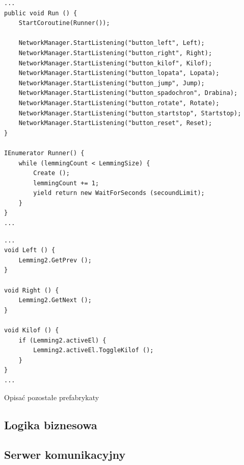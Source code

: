 \begin{lstlisting}[language=CSharp]
...
public void Run () {
	StartCoroutine(Runner());

	NetworkManager.StartListening("button_left", Left);
	NetworkManager.StartListening("button_right", Right);
	NetworkManager.StartListening("button_kilof", Kilof);
	NetworkManager.StartListening("button_lopata", Lopata);
	NetworkManager.StartListening("button_jump", Jump);
	NetworkManager.StartListening("button_spadochron", Drabina);
	NetworkManager.StartListening("button_rotate", Rotate);
	NetworkManager.StartListening("button_startstop", Startstop);
	NetworkManager.StartListening("button_reset", Reset);
}

IEnumerator Runner() {
	while (lemmingCount < LemmingSize) {
		Create ();
		lemmingCount += 1;
		yield return new WaitForSeconds (secoundLimit);
	}
}
...
\end{lstlisting}

\begin{lstlisting}[language=CSharp]
...
void Left () {
	Lemming2.GetPrev ();
}

void Right () {
	Lemming2.GetNext ();
}

void Kilof () {
	if (Lemming2.activeEl) {
		Lemming2.activeEl.ToggleKilof ();
	}
}
...
\end{lstlisting}


{\color{red}Opisać pozostałe prefabrykaty}

\subsection{Logika biznesowa}
\subsection{Serwer komunikacyjny}
